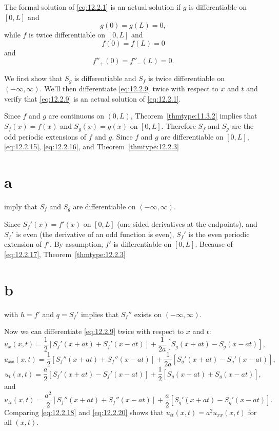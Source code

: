 \begin{theorem}
  \color{blue}
  \label{thmtype:12.2.4} The formal solution of \eqref{eq:12.2.1} is an actual solution if $g$ is
  differentiable on $[0,L]$ and
  \begin{equation}
    \label{eq:12.2.15}g(0)=g(L)=0,
  \end{equation}
  while $f$ is twice differentiable on $[0,L]$ and
  \begin{equation}
    \label{eq:12.2.16}f(0)=f(L)=0
  \end{equation}
  and
  \begin{equation}
    \label{eq:12.2.17}f''_{+}(0)=f''_{-}(L)=0.
  \end{equation}
\end{theorem}

\proof We first show that $S_{g}$ is differentiable and $S_{f}$ is twice differentiable on
$(-\infty,\infty)$. We'll then differentiate \eqref{eq:12.2.9} twice with respect to $x$ and $t$ and
verify that \eqref{eq:12.2.9} is an actual solution of \eqref{eq:12.2.1}.

Since $f$ and $g$ are continuous on $(0,L)$, Theorem~\ref{thmtype:11.3.2} implies that
$S_{f}(x)=f(x)$ and $S_{g}(x)=g(x)$ on $[0,L]$. Therefore $S_{f}$ and $S_{g}$ are the odd periodic
extensions of $f$ and $g$. Since $f$ and $g$ are differentiable on $[0,L]$, \eqref{eq:12.2.15},
\eqref{eq:12.2.16}, and Theorem~\ref{thmtype:12.2.3}\part{a} imply that $S_{f}$ and $S_{g}$ are
differentiable on $(-\infty,\infty)$.

Since $S_{f}'(x)=f'(x)$ on $[0,L]$ (one-sided derivatives at the endpoints), and $S_{f}'$ is even
(the derivative of an odd function is even), $S_{f}'$ is the even periodic extension of $f'$. By
assumption, $f'$ is differentiable on $[0,L]$. Because of \eqref{eq:12.2.17},
Theorem~\ref{thmtype:12.2.3}\part{b} with $h=f'$ and $q=S_{f}'$ implies that $S_{f}''$ exists on
$(-\infty,\infty)$.

Now we can differentiate \eqref{eq:12.2.9} twice with respect to $x$ and $t$:
\[
  u_{x}(x,t)=\frac{1}{2}[S_{f}'(x+at)+S_{f}'(x-at)]+ \frac{1}{2a}[S_{g}(x+at)-S_{g}(x-at)],
\]
\begin{equation}
  \label{eq:12.2.18}u_{xx}(x,t)=\frac{1}{2}[S_{f}''(x+at)+S_{f}''(x-at)]+ \frac{1}{2a}[S_{g}'(x+at)-S_{g}'(x-at)],
\end{equation}
\begin{equation}
  \label{eq:12.2.19}u_{t}(x,t)=\frac{a}{2}[S_{f}'(x+at)-S_{f}'(x-at)]+ \frac{1}{2}[S_{g}(x+at)+S_{g}(x-at)],
\end{equation}
and
\begin{equation}
  \label{eq:12.2.20}u_{tt}(x,t)=\frac{a^{2}}{2}[S_{f}''(x+at)+S_{f}''(x-at)]+ \frac{a}{2}[S_{g}'(x+at)-S_{g}'(x-at)].
\end{equation}
Comparing \eqref{eq:12.2.18} and \eqref{eq:12.2.20} shows that $u_{tt}(x,t)=a^{2}u_{xx}(x,t)$ for
all $(x,t)$.

